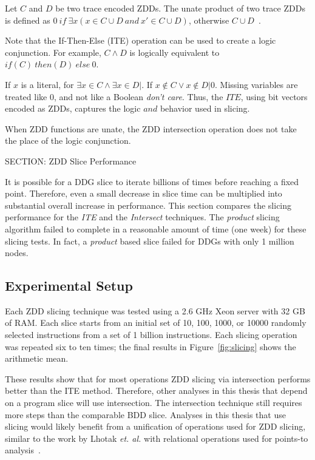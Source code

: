 {Let $C$ and $D$ be two trace encoded ZDDs.  The unate product of two trace ZDDs is defined as $0 \ if \ \exists x(x \in C \cup D \ and \ x' \in C \cup D)$, otherwise $C \cup D$~\cite{hachtel:00:kap}.

Note that the If-Then-Else (ITE) operation can be used to create a logic conjunction.  For example, $C \wedge D$ is logically equivalent to $if(C) \ then(D) \ else \ 0$.

If $x$ is a literal, for $\exists x \in C \wedge \exists x \in D | $. If $x \not \in C \vee x \not \in D|0$.  Missing variables are treated like $0$, and not like a Boolean \textit{don't care}.  Thus, the $ITE$, using bit vectors encoded as ZDDs, captures the logic $and$ behavior used in slicing.

When ZDD functions are unate, the ZDD intersection operation does not take the place of the logic conjunction.

SECTION: ZDD Slice Performance


It is possible for a DDG slice to iterate billions of times before reaching a fixed point.  Therefore, even a small decrease in slice time can be multiplied into substantial overall increase in performance.  This section compares the slicing performance for the \textit{ITE} and the \textit{Intersect} techniques.  The \textit{product} slicing algorithm failed to complete in a reasonable amount of time (one week) for these slicing tests.  In fact, a \textit{product} based slice failed for DDGs with only 1 million nodes.

\subsection {Experimental Setup}

Each ZDD slicing technique was tested using a 2.6 GHz Xeon server with 32 GB of RAM.  Each slice starts from an initial set of 10, 100, 1000, or 10000 randomly selected instructions from a set of 1 billion instructions. Each slicing operation was repeated six to ten times; the final results in Figure~\ref{fig:slicing} shows the arithmetic mean.

These results show that for most operations ZDD slicing via intersection performs better than the ITE method.  Therefore, other analyses in this thesis that depend on a program slice will use intersection.  The intersection technique still requires more steps than the comparable BDD slice.  Analyses in this thesis that use slicing would likely benefit from a unification of operations used for ZDD slicing, similar to the work by Lhotak \textit{et. al.} with relational operations used for points-to analysis~\cite{lhotak:08:lcpc}.

}
